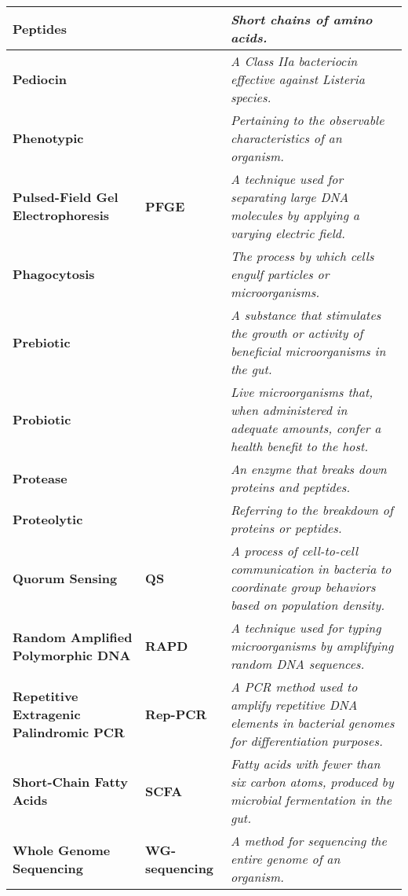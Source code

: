 \begin{longtable}{| p{5cm} | p{2cm} | p{7.5cm} |}
    \hline
    \textbf{Peptides} &  & \textit{Short chains of amino acids.} \\
    \hline
    \textbf{Pediocin} &  & \textit{A Class IIa bacteriocin effective against \textit{Listeria} species.} \\
    \hline
    \textbf{Phenotypic} &  & \textit{Pertaining to the observable characteristics of an organism.} \\
    \hline
    \textbf{Pulsed-Field Gel Electrophoresis} & \textbf{PFGE} & \textit{A technique used for separating large DNA molecules by applying a varying electric field.} \\
    \hline
    \textbf{Phagocytosis} &  & \textit{The process by which cells engulf particles or microorganisms.} \\
    \hline
    \textbf{Prebiotic} &  & \textit{A substance that stimulates the growth or activity of beneficial microorganisms in the gut.} \\
    \hline
    \textbf{Probiotic} &  & \textit{Live microorganisms that, when administered in adequate amounts, confer a health benefit to the host.} \\
    \hline
    \textbf{Protease} &  & \textit{An enzyme that breaks down proteins and peptides.} \\
    \hline
    \textbf{Proteolytic} &  & \textit{Referring to the breakdown of proteins or peptides.} \\
    \hline
    \textbf{Quorum Sensing} & \textbf{QS} & \textit{A process of cell-to-cell communication in bacteria to coordinate group behaviors based on population density.} \\
    \hline
    \textbf{Random Amplified Polymorphic DNA} & \textbf{RAPD} & \textit{A technique used for typing microorganisms by amplifying random DNA sequences.} \\
    \hline
    \textbf{Repetitive Extragenic Palindromic PCR} & \textbf{Rep-PCR} & \textit{A PCR method used to amplify repetitive DNA elements in bacterial genomes for differentiation purposes.} \\
    \hline
    \textbf{Short-Chain Fatty Acids} & \textbf{SCFA} & \textit{Fatty acids with fewer than six carbon atoms, produced by microbial fermentation in the gut.} \\
    \hline
    \textbf{Whole Genome Sequencing} & \textbf{WG-sequencing} & \textit{A method for sequencing the entire genome of an organism.} \\
    \end{longtable}




